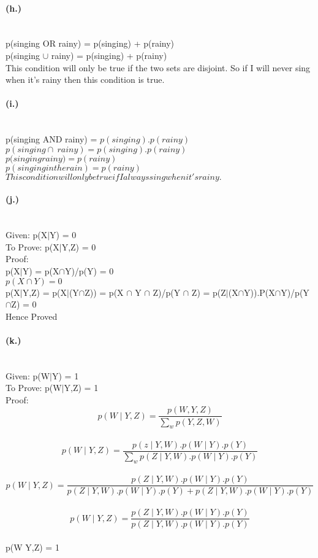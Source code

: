 \documentclass{article}
\begin{document}
{\paragraph{(h.)}
\\p(singing OR rainy) = p(singing) + p(rainy)
\\\Rightarrow p(singing $\cup$ rainy) = p(singing) + p(rainy)
\\This condition will only be true if the two sets are disjoint. So if I will never sing when it's rainy then this condition is true.
\paragraph{(i.)}

\\p(singing AND rainy) = $p(singing) . p(rainy)$
\\\Rightarrow $p(singing \cap \: rainy) = p(singing) . p(rainy)$
\\\Rightarrow $p(singing $\mid$ rainy) = p(rainy)$
\\\Rightarrow $p(singing in the rain)  = p(rainy)$
\\$This condition will only be true if I always sing when it's rainy.$
\paragraph{(j.)}
\\Given: p(X$\mid$Y) = 0
\\To Prove: p(X$\mid$Y,Z) = 0
\\Proof:
\\p(X$\mid$Y) = p(X$\cap$Y)/p(Y) = 0
\\\Rightarrow $p(X\cap Y) = 0$
\\p(X$\mid$Y,Z) = p(X$\mid$(Y$\cap$Z)) = p(X $\cap$ Y $\cap$ Z)/p(Y $\cap$ Z) = p(Z$\mid$(X$\cap$Y)).P(X$\cap$Y)/p(Y$\cap$Z) = 0
\\Hence Proved
\paragraph{(k.)}
\\Given: p(W$\mid$Y) = 1
\\To Prove: p(W$\mid$Y,Z) = 1
\\Proof:
\\$$p(W \mid Y,Z) = \frac{p(W,Y,Z)}{\sum_w p(Y,Z,W)}$$
\\$$p(W \mid Y,Z) = \frac{p(z\mid Y,W).p(W\mid Y).p(Y)}{\sum_w p(Z \mid Y,W).p(W \mid Y).p(Y)}$$
\\$$p(W \mid Y,Z) = \frac{p(Z \mid Y,W).p(W \mid Y).p(Y)}{p(Z \mid Y,W).p(W \mid Y).p(Y)+p(Z \mid Y,W).p(W \mid Y).p(Y)}$$
\\$$p(W \mid Y,Z) = \frac{p(Z \mid Y,W).p(W \mid Y).p(Y)}{p(Z \mid Y,W).p(W \mid Y).p(Y)}$$
\\$$p(W \mid Y,Z) = 1

}
\end{document}
